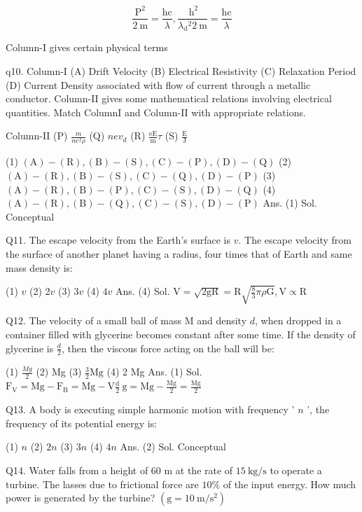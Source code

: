 \begin{enumerate}
$$
\frac{\mathrm{P}^{2}}{2 \mathrm{~m}}=\frac{\mathrm{hc}}{\lambda}, \frac{\mathrm{~h}^{2}}{\lambda_{\mathrm{d}}{ }^{2} 2 \mathrm{~m}}=\frac{\mathrm{hc}}{\lambda}
$$

Column-I gives certain physical terms


q10. 
{Column-I}
(A) Drift Velocity
(B) Electrical Resistivity
(C) Relaxation Period
(D) Current Density associated with flow of current through a metallic conductor.
Column-II gives some mathematical relations involving electrical quantities. Match ColumnI and Column-II with appropriate relations.

{Column-II}
(P) $\frac{m}{n e^{2} \rho}$
(Q) $n e v_{d}$
(R) $\frac{\mathrm{eE}}{\mathrm{m}} \tau$
(S) $\frac{\mathrm{E}}{\mathrm{J}}$

(1) $(\mathrm{A})-(\mathrm{R}),(\mathrm{B})-(\mathrm{S}),(\mathrm{C})-(\mathrm{P}),(\mathrm{D})-(\mathrm{Q})$
(2) $(\mathrm{A})-(\mathrm{R}),(\mathrm{B})-(\mathrm{S}),(\mathrm{C})-(\mathrm{Q}),(\mathrm{D})-(\mathrm{P})$
(3) $(\mathrm{A})-(\mathrm{R}),(\mathrm{B})-(\mathrm{P}),(\mathrm{C})-(\mathrm{S}),(\mathrm{D})-(\mathrm{Q})$
(4) $(\mathrm{A})-(\mathrm{R}),(\mathrm{B})-(\mathrm{Q}),(\mathrm{C})-(\mathrm{S}),(\mathrm{D})-(\mathrm{P})$
Ans. (1)
Sol. Conceptual

Q11. The escape velocity from the Earth's surface is $v$. The escape velocity from the surface of another planet having a radius, four times that of Earth and same mass density is:

(1) $v$
(2) $2 v$
(3) $3 v$
(4) $4 v$
Ans. (4)
Sol. $\mathrm{V}=\sqrt{2 \mathrm{gR}}=\mathrm{R} \sqrt{\frac{8}{3} \pi \rho \mathrm{G}}, \mathrm{V} \propto \mathrm{R}$

Q12. The velocity of a small ball of mass M and density $d$, when dropped in a container filled with glycerine becomes constant after some time. If the density of glycerine is $\frac{d}{2}$, then the viscous force acting on the ball will be:

(1) $\frac{M g}{2}$
(2) Mg
(3) $\frac{3}{2} \mathrm{Mg}$
(4) 2 Mg
Ans. (1)
Sol. $\mathrm{F}_{\mathrm{V}}=\mathrm{Mg}-\mathrm{F}_{\mathrm{B}}=\mathrm{Mg}-\mathrm{V} \frac{\mathrm{d}}{2} \mathrm{~g}=\mathrm{Mg}-\frac{\mathrm{Mg}}{2}=\frac{\mathrm{Mg}}{2}$

Q13. A body is executing simple harmonic motion with frequency ' $n$ ', the frequency of its potential energy is:

(1) $n$
(2) $2 n$
(3) $3 n$
(4) $4 n$
Ans. (2)
Sol. Conceptual

Q14. Water falls from a height of 60 m at the rate of $15 \mathrm{~kg} / \mathrm{s}$ to operate a turbine. The lasses due to frictional force are $10 \%$ of the input energy. How much power is generated by the turbine? $\left(\mathrm{g}=10 \mathrm{~m} / \mathrm{s}^{2}\right)$


\end{enumerate}
